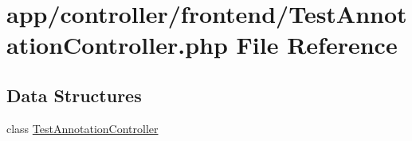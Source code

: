 \hypertarget{controller_2frontend_2_test_annotation_controller_8php}{\section{app/controller/frontend/\-Test\-Annotation\-Controller.php File Reference}
\label{controller_2frontend_2_test_annotation_controller_8php}
}
\subsection*{Data Structures}
\begin{DoxyCompactItemize}
\item 
class \hyperlink{class_test_annotation_controller}{Test\-Annotation\-Controller}
\end{DoxyCompactItemize}
